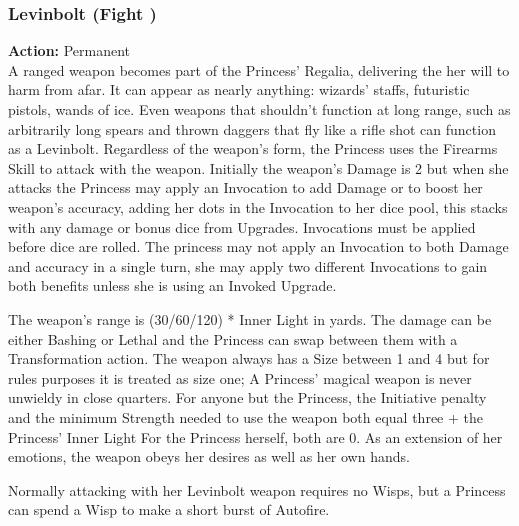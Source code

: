 \subsubsection*{Levinbolt (Fight \textbullet)}

\noindent \textbf{Action:} Permanent\\

\noindent A ranged weapon becomes part of the Princess’ Regalia, delivering the her will to harm from afar. It can appear as nearly anything: wizards’ staffs, futuristic pistols, wands of ice. Even weapons that shouldn't function at long range, such as arbitrarily long spears and thrown daggers that fly like a rifle shot can function as a Levinbolt. Regardless of the weapon's form, the Princess uses the Firearms Skill to attack with the weapon. Initially the weapon's Damage is 2 but when she attacks the Princess may apply an Invocation to add Damage or to boost her weapon's accuracy, adding her dots in the Invocation to her dice pool, this stacks with any damage or bonus dice from Upgrades. Invocations must be applied before dice are rolled. The princess may not apply an Invocation to both Damage and accuracy in a single turn, she may apply two different Invocations to gain both benefits unless she is using an Invoked Upgrade.  

The weapon’s range is (30/60/120) * Inner Light in yards. The damage can be either Bashing or Lethal and the Princess can swap between them with a Transformation action. The weapon always has a Size between 1 and 4 but for rules purposes it is treated as size one; A Princess' magical weapon is never unwieldy in close quarters. For anyone but the Princess, the Initiative penalty and the minimum Strength needed to use the weapon both equal three + the Princess' Inner Light For the Princess herself, both are 0. As an extension of her emotions, the weapon obeys her desires as well as her own hands.

Normally attacking with her Levinbolt weapon requires no Wisps, but a Princess can spend a Wisp to make a short burst of Autofire.

